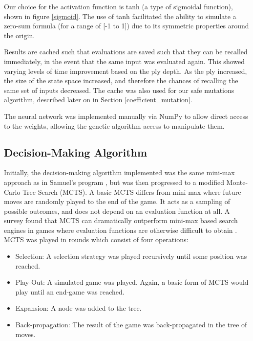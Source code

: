 \documentclass[12pt,a4paper]{article}
\begin{document}
        Our choice for the activation function is tanh (a type of sigmoidal function), shown in figure \ref{sigmoid}. 
        The use of tanh facilitated the ability to simulate a zero-sum formula (for a range of [-1 to 1]) due to its symmetric properties around the origin.
        
        Results are cached such that evaluations are saved such that they can be recalled immediately, in the event that the same input was evaluated again. This showed  varying levels of time improvement based on the ply depth. As the ply increased, the size of the state space increased, and therefore the chances of recalling the same set of inputs decreased. The cache was also used for our safe mutations algorithm, described later on in Section \ref{coefficient_mutation}.

        The neural network was implemented manually via NumPy to allow direct access to the weights, allowing the genetic algorithm access to manipulate them.
    
    \subsection{Decision-Making Algorithm}
        Initially, the decision-making algorithm implemented was the same mini-max approach as in Samuel's program \cite{samuel_studies_1959}, but was then progressed to a modified Monte-Carlo Tree Search (MCTS). A basic MCTS differs from mini-max where future moves are randomly played to the end of the game. It acts as a sampling of possible outcomes, and does not depend on an evaluation function at all. A survey found that MCTS can dramatically outperform mini-max based search engines in games where evaluation functions are otherwise difficult to obtain \cite{browne_survey_2012}. MCTS was played in rounds which consist of four operations:

        \begin{itemize}
            \item Selection: A selection strategy was played recursively until some position was reached. 
            \item Play-Out: A simulated game was played. Again, a basic form of MCTS would play until an end-game was reached.
            \item Expansion: A node was added to the tree.
            \item Back-propagation: The result of the game was back-propagated in the tree of moves.
        \end{itemize}
\end{document}
